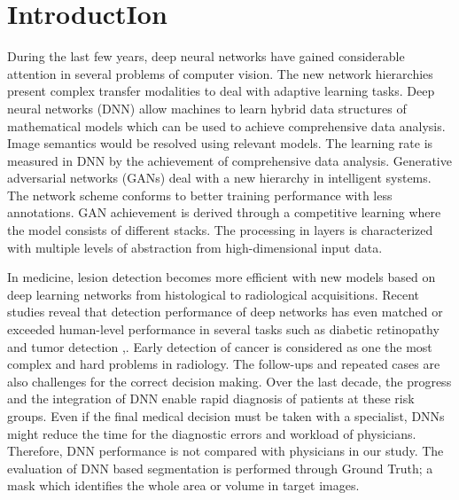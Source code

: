 \chapter{IntroductIon}

During the last few years, deep neural networks have gained considerable attention in several problems of computer vision.
The new network hierarchies present complex transfer modalities to deal with adaptive learning tasks.
Deep neural networks (DNN) allow machines to learn hybrid data structures of mathematical models which can be used to achieve comprehensive data analysis.
Image semantics would be resolved using relevant models.
The learning rate is measured in DNN by the achievement of comprehensive data analysis.
Generative adversarial networks (GANs) deal with a new hierarchy in intelligent systems.
The network scheme conforms to better training performance with less annotations.
GAN achievement is derived through a competitive learning where the model consists of different stacks.
The processing in layers is characterized with multiple levels of abstraction from high-dimensional input data.

In medicine, lesion detection becomes more efficient with new models based on deep learning networks from histological to radiological acquisitions.
Recent studies reveal that detection performance of deep networks has even matched or exceeded human-level performance in several tasks such as diabetic retinopathy and tumor detection \cite{gulshan2016development},\cite{icsin2016review}.
Early detection of cancer is considered as one the most complex and hard problems in radiology.
The follow-ups and repeated cases are also challenges for the correct decision making.
Over the last decade, the progress and the integration of DNN enable rapid diagnosis of patients at these risk groups.
Even if the final medical decision must be taken with a specialist, DNNs might reduce the time for the diagnostic errors and workload of physicians.
Therefore, DNN performance is not compared with physicians in our study.
The evaluation of DNN based segmentation is performed through Ground Truth; a mask which identifies the whole area or volume in target images.

